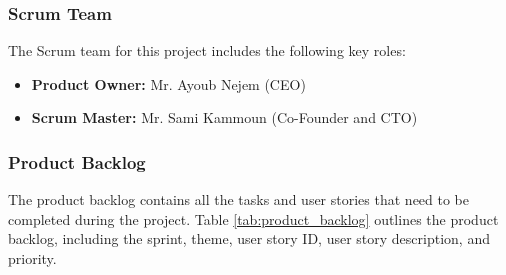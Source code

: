 \subsubsection{Scrum Team}
The Scrum team for this project includes the following key roles:
\begin{itemize}
    \item \textbf{Product Owner:} Mr. Ayoub Nejem (CEO)
    \item \textbf{Scrum Master:} Mr. Sami Kammoun (Co-Founder and CTO)
\end{itemize}

\subsubsection{Product Backlog}
The product backlog contains all the tasks and user stories that need to be completed during the project. Table \ref{tab:product_backlog} outlines the product backlog, including the sprint, theme, user story ID, user story description, and priority.

